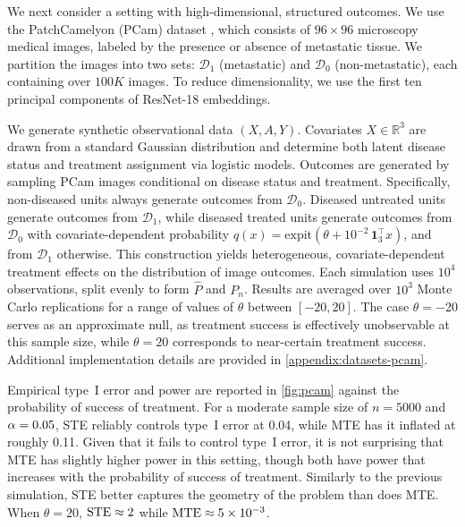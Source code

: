 \documentclass{article}
\theoremstyle{plain}
\theoremstyle{definition}
\theoremstyle{remark}
\newcommand{\hP}{\widehat{P}}
\newcommand{\1}{\mathbbm{1}}
\theoremstyle{plain}
\theoremstyle{definition}
\begin{document}
We next consider a setting with high-dimensional, structured outcomes. We use the PatchCamelyon (PCam) dataset \cite{veeling2018rotation}, which consists of $96\times96$ microscopy medical images, labeled by the presence or absence of metastatic tissue. We partition the images into two sets: $\mathcal D_1$ (metastatic) and $\mathcal D_0$ (non-metastatic), each containing over $100K$ images. To reduce dimensionality, we use the first ten principal components of ResNet-18 \cite{he2016deep} embeddings.


We generate synthetic observational data $(X,A,Y)$.
Covariates $X\in\mathbb R^3$ are drawn from a standard Gaussian distribution and determine
both latent disease status and treatment assignment via logistic models.
Outcomes are generated by sampling PCam images conditional on disease status and
treatment. Specifically, non-diseased units always generate outcomes from
$\mathcal D_0$. Diseased untreated units generate outcomes from $\mathcal D_1$,
while diseased treated units generate outcomes from $\mathcal D_0$ with
covariate-dependent probability
$q(x) = \mathrm{expit}\!\left(\theta + 10^{-2}\,\mathbf 1_3^\top x\right)$,
and from $\mathcal D_1$ otherwise. This construction yields heterogeneous,
covariate-dependent treatment effects on the distribution of image outcomes. Each simulation uses $10^4$ observations, split evenly to form $\hP$ and
$P_n$. Results are averaged over $10^3$ Monte Carlo replications for a range of values of $\theta$ between $[-20, 20]$. The case $\theta=-20$ serves as an approximate
null, as treatment success is effectively unobservable at this sample size,
while $\theta=20$ corresponds to near-certain treatment success. Additional implementation
details are provided in \cref{appendix:datasets-pcam}.

Empirical type~I error and power are reported in \cref{fig:pcam} against the probability of success of treatment. For a moderate sample size of $n=5000$ and $\alpha=\textnormal{0.05}$, STE reliably controls type~I error at 0.04, while MTE has it inflated at roughly 0.11. Given that it fails to control type~I error, it is not surprising that MTE has slightly higher power in this setting, though both have power that increases with the probability of success of treatment. Similarly to the previous simulation, STE better captures the geometry of the problem than does MTE. When $\theta=20$, $\textnormal{STE}\approx 2$ while $\textnormal{MTE}\approx 5\times 10^{-3}$.
\end{document}
